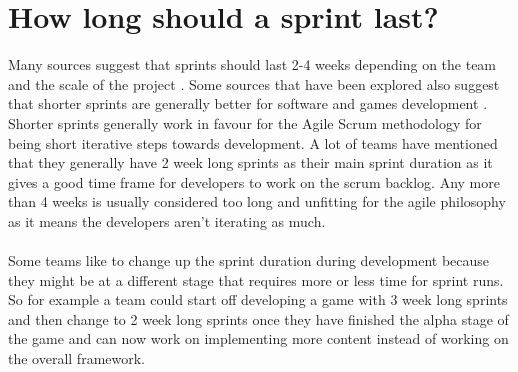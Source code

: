 \documentclass{scrartcl}
\begin{document}
\section{How long should a sprint last?}
Many sources suggest that sprints should last 2-4 weeks depending on the team and the scale of the project \cite{two} \cite{four} \cite{five}. Some sources that have been explored also suggest that shorter sprints are generally better for software and games development \cite{three}. Shorter sprints generally work in favour for the Agile Scrum methodology for being short iterative steps towards development. A lot of teams have mentioned that they generally have 2 week long sprints as their main sprint duration as it gives a good time frame for developers to work on the scrum backlog. Any more than 4 weeks is usually considered too long and unfitting for the agile philosophy as it means the developers aren't iterating as much.
\\~\\
Some teams like to change up the sprint duration during development because they might be at a different stage that requires more or less time for sprint runs. So for example a team could start off developing a game with 3 week long sprints and then change to 2 week long sprints once they have finished the alpha stage of the game and can now work on implementing more content instead of working on the overall framework.
\end{document}
